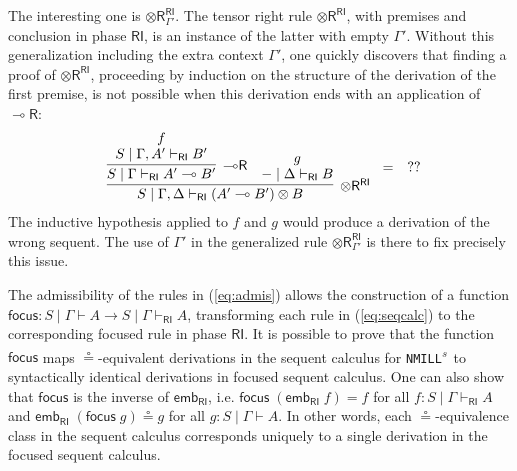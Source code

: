 \documentclass[submission,copyright,creativecommons]{eptcs}
\theoremstyle{definition}
\newcommand{\tr}{\otimes \mathsf{R}}
\newcommand{\lright}{{\multimap}\mathsf{R}}
\newcommand{\ot}{\otimes}
\newcommand{\lolli}{\multimap}
\newcommand{\RI}{\mathsf{RI}}
\newcommand{\proofbox}[1]{\begin{tabular}{l} #1 \end{tabular}}
\newcommand{\NMILL}{\texttt{NMILL}}
\newcommand{\SkNMILL}{\NMILL\textsuperscript{\textit{s}}}
\begin{document}
The interesting one is $\tr_{\Gamma'}^{\RI}$. The tensor right rule $\tr^\RI$, with premises and conclusion in phase $\RI$, is an instance of the latter with empty $\Gamma'$. 
Without this generalization including the extra context $\Gamma'$, one quickly discovers that finding a proof of $\tr^\RI$, proceeding by induction on the structure of the derivation of the first premise, is not possible when this derivation ends with an application of $\lright$:
\begin{displaymath}
  \proofbox{
    \infer[\tr^{\RI}]{S \mid \Gamma , \Delta \vdash_{\RI} (A' \lolli B') \ot B}{
    \infer[\lright]{S \mid \Gamma \vdash_{\RI} A' \lolli B'}{
      \deduce{S \mid \Gamma , A' \vdash_{\RI} B'}{f}
    }
    &
    \deduce{- \mid \Delta \vdash_{\RI} B}{g}
    }
    } = \quad ??
\end{displaymath}
The inductive hypothesis applied to $f$ and $g$ would produce a derivation of the wrong sequent. The use of $\Gamma'$ in the generalized rule $\tr_{\Gamma'}^{\RI}$ is there to fix precisely this issue.

The admissibility of the rules in (\ref{eq:admis}) allows the construction of a function $\mathsf{focus} : S \mid \Gamma \vdash A \to S \mid \Gamma \vdash_\RI A$, transforming each rule in (\ref{eq:seqcalc}) to the corresponding focused rule in phase $\RI$.
It is possible to prove that the function $\mathsf{focus}$ maps  $\circeq$-equivalent derivations in the sequent calculus for \SkNMILL\ to syntactically identical derivations in focused sequent calculus. One can also show that $\mathsf{focus}$ is the inverse of $\mathsf{emb}_\RI$, i.e. $\mathsf{focus}\;(\mathsf{emb}_\RI \;f) = f$ for all $f : S \mid \Gamma \vdash_\RI A$ and $\mathsf{emb}_\RI\;(\mathsf{focus}\;g) \circeq g$ for all $g : S \mid \Gamma \vdash A$. In other words, each $\circeq$-equivalence class in the sequent calculus corresponds uniquely to a single derivation in the focused sequent calculus.
\end{document}

